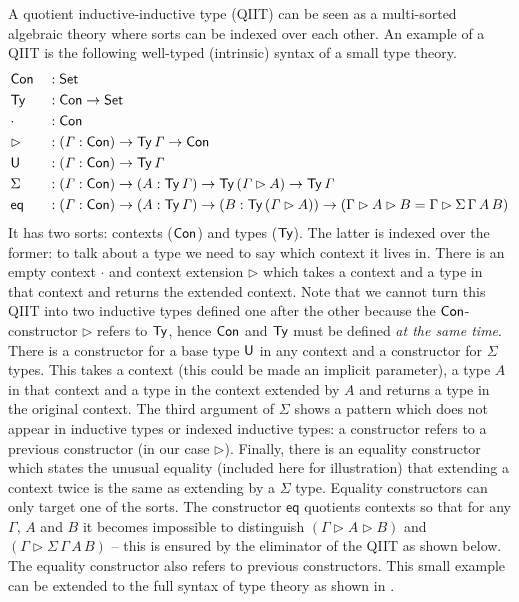 \documentclass[acmsmall,review,anonymous]{acmart}\settopmatter{printfolios=true,printccs=false,printacmref=false}
\begin{document}
A quotient inductive-inductive type (QIIT) can be seen as a
multi-sorted algebraic theory where sorts can be indexed over each
other. An example of a QIIT is the following well-typed (intrinsic)
syntax of a small type theory.
\begin{alignat*}{5}
  & \mathsf{Con} && : \mathsf{Set} \\
  & \mathsf{Ty} && : \mathsf{Con}\rightarrow\mathsf{Set} \\
  & \cdot && : \mathsf{Con} \\
  & \rhd && : (\mathit{\Gamma}:\mathsf{Con})\rightarrow\mathsf{Ty}\,\mathit{\Gamma}\rightarrow\mathsf{Con} \\
  & \mathsf{U} && : (\mathit{\Gamma}:\mathsf{Con})\rightarrow\mathsf{Ty}\,\mathit{\Gamma} \\
  & \Sigma && : (\mathit{\Gamma}:\mathsf{Con})\rightarrow(A:\mathsf{Ty}\,\mathit{\Gamma})\rightarrow\mathsf{Ty}\,(\mathit{\Gamma}\rhd A)\rightarrow\mathsf{Ty}\,\mathit{\Gamma} \\
  & \mathsf{eq} && : (\mathit{\Gamma}:\mathsf{Con})\rightarrow(A:\mathsf{Ty}\,\mathit{\Gamma})\rightarrow(B:\mathsf{Ty}\,(\mathit{\Gamma}\rhd A))\rightarrow (\Gamma\rhd A \rhd B = \Gamma\rhd \Sigma\,\Gamma\,A\,B)
\end{alignat*}
It has two sorts: contexts ($\mathsf{Con}$) and types ($\mathsf{Ty}$). The latter is
indexed over the former: to talk about a type we need to say which
context it lives in. There is an empty context $\cdot$ and context
extension $\rhd$ which takes a context and a type in that context and
returns the extended context. Note that we cannot turn this QIIT into
two inductive types defined one after the other because the
$\mathsf{Con}$-constructor $\rhd$ refers to $\mathsf{Ty}$, hence $\mathsf{Con}$ and $\mathsf{Ty}$ must
be defined \emph{at the same time}. There is a constructor for a base
type $\mathsf{U}$ in any context and a constructor for $\Sigma$ types. This
takes a context (this could be made an implicit parameter), a type $A$
in that context and a type in the context extended by $A$ and returns
a type in the original context. The third argument of $\Sigma$ shows a
pattern which does not appear in inductive types or indexed inductive
types: a constructor refers to a previous constructor (in our case
$\rhd$). Finally, there is an equality constructor which states the
unusual equality (included here for illustration) that extending a
context twice is the same as extending by a $\Sigma$ type. Equality
constructors can only target one of the sorts. The constructor
$\mathsf{eq}$ quotients contexts so that for any $\Gamma$, $A$ and $B$
it becomes impossible to distinguish $(\Gamma\rhd A \rhd B)$ and
$(\Gamma\rhd \Sigma\,\Gamma\,A\,B)$ -- this is ensured by the
eliminator of the QIIT as shown below. The equality constructor also
refers to previous constructors. This small example can be extended to
the full syntax of type theory as shown in \cite{ttintt}.
\end{document}
